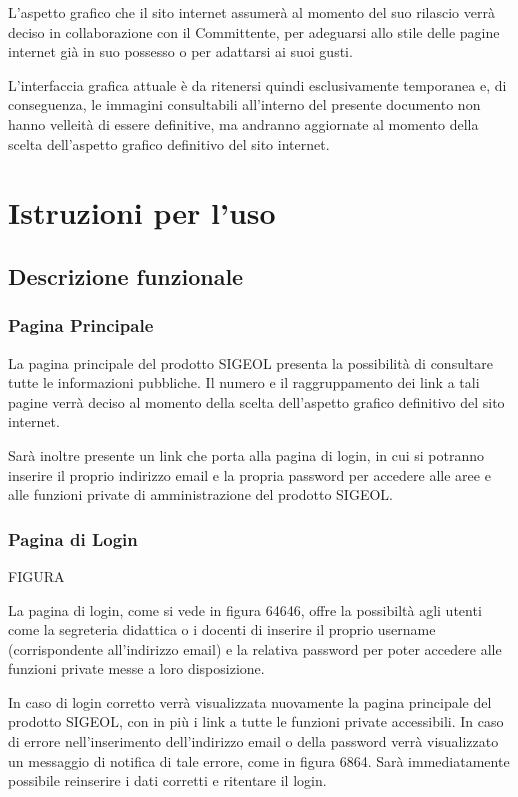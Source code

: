 \documentclass[11pt,a4paper]{article}
\begin{document}
L'aspetto grafico che il sito internet assumerà al momento del suo rilascio verrà deciso in collaborazione con il Committente, per adeguarsi allo stile delle pagine internet già in suo possesso o per adattarsi ai suoi gusti.

L'interfaccia grafica attuale è da ritenersi quindi esclusivamente temporanea e, di conseguenza, le immagini consultabili all'interno del presente documento non hanno velleità di essere definitive, ma andranno aggiornate al momento della scelta dell'aspetto grafico definitivo del sito internet.
\section{Istruzioni per l'uso}
\subsection{Descrizione funzionale}
\subsubsection{Pagina Principale}
La pagina principale del prodotto SIGEOL presenta la possibilità di consultare tutte le informazioni pubbliche. Il numero e il raggruppamento dei link a tali pagine verrà deciso al momento della scelta dell'aspetto grafico definitivo del sito internet.

Sarà inoltre presente un link che porta alla pagina di login, in cui si potranno inserire il proprio indirizzo email e la propria password per accedere alle aree e alle funzioni private di amministrazione del prodotto SIGEOL.
\subsubsection{Pagina di Login}
\begin{LARGE}FIGURA\end{LARGE}

La pagina di login, come si vede in figura 64646, offre la possibiltà agli utenti come la segreteria didattica o i docenti di inserire il proprio username (corrispondente all'indirizzo email) e la relativa password per poter accedere alle funzioni private messe a loro disposizione.

In caso di login corretto verrà visualizzata nuovamente la pagina principale del prodotto SIGEOL, con in più i link a tutte le funzioni private accessibili.
In caso di errore nell'inserimento dell'indirizzo email o della password verrà visualizzato un messaggio di notifica di tale errore, come in figura 6864.
Sarà immediatamente possibile reinserire i dati corretti e ritentare il login.
\end{document}
